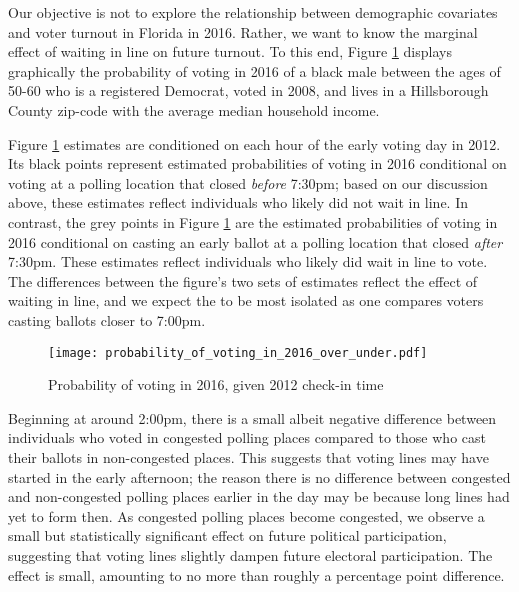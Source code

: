 \documentclass[12pt,titlepage]{article}
\begin{document}
Our objective is not to explore the relationship between demographic
covariates and voter turnout in Florida in 2016.  Rather, we want to
know the marginal effect of waiting in line on future turnout.  To
this end, Figure \ref{fig:prvoting2016} displays graphically the
probability of voting in 2016 of a black male between the ages of
50-60 who is a registered Democrat, voted in 2008, and lives in a
Hillsborough County zip-code with the average median household income.

Figure \ref{fig:prvoting2016} estimates are conditioned on each hour
of the early voting day in 2012. Its black points represent estimated
probabilities of voting in 2016 conditional on voting at a polling
location that closed \emph{before} 7:30pm; based on our discussion
above, these estimates reflect individuals who likely did not wait in
line.  In contrast, the grey points in Figure \ref{fig:prvoting2016}
are the estimated probabilities of voting in 2016 conditional on
casting an early ballot at a polling location that closed \emph{after}
7:30pm.  These estimates reflect individuals who likely did wait in
line to vote.  The differences between the figure's two sets of
estimates reflect the effect of waiting in line, and we expect the to
be most isolated as one compares voters casting ballots closer to
7:00pm.

\begin{figure}[!ht]
\caption{Probability of voting in 2016, given 2012 check-in time}
  \label{fig:prvoting2016}
  \centering
    \centering\texttt{[image: probability\_of\_voting\_in\_2016\_over\_under.pdf]}
\end{figure}

Beginning at around 2:00pm, there is a small albeit negative
difference between individuals who voted in congested polling places
compared to those who cast their ballots in non-congested places.
This suggests that voting lines may have started in the early
afternoon; the reason there is no difference between congested and
non-congested polling places earlier in the day may be because long
lines had yet to form then. As congested polling places become
congested, we observe a small but statistically significant effect on
future political participation, suggesting that voting lines slightly
dampen future electoral participation.  The effect is small, amounting
to no more than roughly a percentage point difference.
\end{document}
